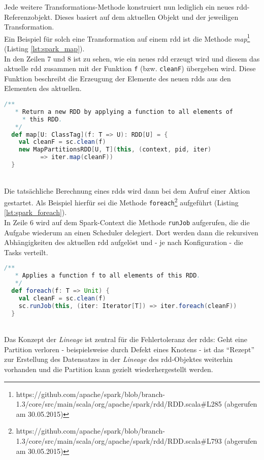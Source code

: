 Jede weitere Transformations-Methode konstruiert nun lediglich ein neues \gls{rdd}-Referenzobjekt. Dieses basiert auf dem aktuellen Objekt und der jeweiligen Transformation.\\

Ein Beispiel für solch eine Transformation auf einem \gls{rdd} ist die Methode \textit{map}\footnote{https://github.com/apache/spark/blob/branch-1.3/core/src/main/scala/org/apache/spark/rdd/RDD.scala#L285 (abgerufen am 30.05.2015)} (Listing \ref{lst:spark_map}).\\

In den Zeilen 7 und 8 ist zu sehen, wie ein neues \gls{rdd} erzeugt wird und diesem das aktuelle \gls{rdd} zusammen mit der Funktion \lstinline|f| (bzw. \lstinline|cleanF|) übergeben wird. Diese Funktion beschreibt die Erzeugung der Elemente des neuen \gls{rdd}s aus den Elementen des aktuellen.\\

\begin{lstlisting}[language=Scala,caption={Map-Methode aus org.apache.spark.rdd.RDD v1.3.0},label={lst:spark_map}]
  /**
   * Return a new RDD by applying a function to all elements of 
	 * this RDD.
   */
  def map[U: ClassTag](f: T => U): RDD[U] = {
    val cleanF = sc.clean(f)
    new MapPartitionsRDD[U, T](this, (context, pid, iter) 
		  => iter.map(cleanF))
  }
\end{lstlisting}
\\
Die tatsächliche Berechnung eines \glspl{rdd} wird dann bei dem Aufruf einer Aktion gestartet. Als Beispiel hierfür sei die Methode \lstinline|foreach|\footnote{https://github.com/apache/spark/blob/branch-1.3/core/src/main/scala/org/apache/spark/rdd/RDD.scala#L793 (abgerufen am 30.05.2015)} aufgeführt (Listing \ref{lst:spark_foreach}).\\
In Zeile 6 wird auf dem Spark-Context die Methode \lstinline|runJob| aufgerufen, die die Aufgabe wiederum an einen Scheduler delegiert. Dort werden dann die rekursiven Abhängigkeiten des aktuellen \gls{rdd} aufgelöst und - je nach Konfiguration - die Tasks verteilt.\\

\begin{lstlisting}[language=Scala,caption={foreach-Methode aus org.apache.spark.rdd.RDD v1.3.0},label={lst:spark_foreach}]
  /**
   * Applies a function f to all elements of this RDD.
   */
  def foreach(f: T => Unit) {
    val cleanF = sc.clean(f)
    sc.runJob(this, (iter: Iterator[T]) => iter.foreach(cleanF))
  }
\end{lstlisting}
\\
Das Konzept der \textit{Lineage} ist zentral für die Fehlertoleranz der \gls{rdd}s:
Geht eine Partition verloren - beispielsweise durch Defekt eines Knotens - ist das "`Rezept"' zur Erstellung des Datensatzes in der \textit{Lineage} des \gls{rdd}-Objektes weiterhin vorhanden und die Partition kann gezielt wiederhergestellt werden.\\

